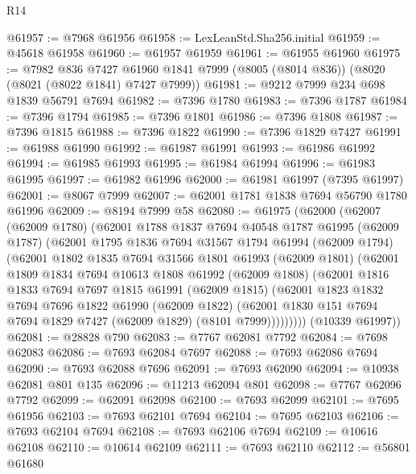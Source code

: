 \begin{lexlean}{R14}
\begin{coremodule}
@61957 := @7968 @61956
@61958 := LexLeanStd.Sha256.initial
@61959 := @45618 @61958
@61960 := @61957 @61959
@61961 := @61955 @61960
@61975 := @7982
    @836
    @7427
    @61960
    @1841
    @7999
    (@8005 (@8014 @836))
    (@8020 (@8021 (@8022 @1841) @7427 @7999))
@61981 := @9212 @7999 @234 @698 @1839 @56791 @7694
@61982 := @7396 @1780
@61983 := @7396 @1787
@61984 := @7396 @1794
@61985 := @7396 @1801
@61986 := @7396 @1808
@61987 := @7396 @1815
@61988 := @7396 @1822
@61990 := @7396 @1829 @7427
@61991 := @61988 @61990
@61992 := @61987 @61991
@61993 := @61986 @61992
@61994 := @61985 @61993
@61995 := @61984 @61994
@61996 := @61983 @61995
@61997 := @61982 @61996
@62000 := @61981 @61997 (@7395 @61997)
@62001 := @8067 @7999
@62007 := @62001 @1781 @1838 @7694 @56790 @1780 @61996
@62009 := @8194 @7999 @58
@62080 := @61975
    (@62000
      (@62007
        (@62009 @1780)
        (@62001
          @1788
          @1837
          @7694
          @40548
          @1787
          @61995
          (@62009 @1787)
          (@62001
            @1795
            @1836
            @7694
            @31567
            @1794
            @61994
            (@62009 @1794)
            (@62001
              @1802
              @1835
              @7694
              @31566
              @1801
              @61993
              (@62009 @1801)
              (@62001
                @1809
                @1834
                @7694
                @10613
                @1808
                @61992
                (@62009 @1808)
                (@62001
                  @1816
                  @1833
                  @7694
                  @7697
                  @1815
                  @61991
                  (@62009 @1815)
                  (@62001
                    @1823
                    @1832
                    @7694
                    @7696
                    @1822
                    @61990
                    (@62009 @1822)
                    (@62001 @1830 @151 @7694 @7694 @1829 @7427 (@62009 @1829) (@8101 @7999)))))))))
      (@10339 @61997))
@62081 := @28828 @790
@62083 := @7767 @62081 @7792
@62084 := @7698 @62083
@62086 := @7693 @62084 @7697
@62088 := @7693 @62086 @7694
@62090 := @7693 @62088 @7696
@62091 := @7693 @62090
@62094 := @10938 @62081 @801 @135
@62096 := @11213 @62094 @801
@62098 := @7767 @62096 @7792
@62099 := @62091 @62098
@62100 := @7693 @62099
@62101 := @7695 @61956
@62103 := @7693 @62101 @7694
@62104 := @7695 @62103
@62106 := @7693 @62104 @7694
@62108 := @7693 @62106 @7694
@62109 := @10616 @62108
@62110 := @10614 @62109
@62111 := @7693 @62110
@62112 := @56801 @61680

\end{coremodule}
\end{lexlean}
